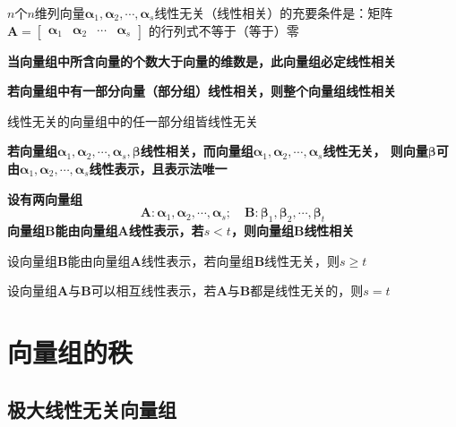 \documentclass[UTF8]{ctexart}
\newcommand{\ve}[1]{{\bm{#1}}}
\newcommand{\mat}[1]{\ve{#1}}
\newcommand{\emplin}{\vspace{1em}}
\begin{document}
$n$个$n$维列向量$\mat{\alpha}_1,\mat{\alpha}_2,\cdots,\mat{\alpha}_s$线性无关（线性相关）的充要条件是：矩阵$\mat{A}=\begin{bmatrix}\mat{\alpha}_1&\mat{\alpha}_2&\cdots&\mat{\alpha}_s\end{bmatrix}$
的行列式不等于（等于）零

\textbf{当向量组中所含向量的个数大于向量的维数是，此向量组必定线性相关}

\emplin
\emplin

\textbf{若向量组中有一部分向量（部分组）线性相关，则整个向量组线性相关}

线性无关的向量组中的任一部分组皆线性无关

\emplin
\emplin

\textbf{若向量组$\mat{\alpha}_1,\mat{\alpha}_2,\cdots,\mat{\alpha}_s,\mat{\beta}$线性相关，而向量组$\mat{\alpha}_1,\mat{\alpha}_2,\cdots,\mat{\alpha}_s$线性无关，
则向量$\mat{\beta}$可由$\mat{\alpha}_1,\mat{\alpha}_2,\cdots,\mat{\alpha}_s$线性表示，且表示法唯一}

\emplin
\emplin

\textbf{设有两向量组
\[\mat{A}:\mat{\alpha}_1,\mat{\alpha}_2,\cdots,\mat{\alpha}_s;\quad\mat{B}:\mat{\beta}_1,\mat{\beta}_2,\cdots,\mat{\beta}_t\]
向量组$\mat{B}$能由向量组$\mat{A}$线性表示，若$s<t$，则向量组$\mat{B}$线性相关}

设向量组$\mat{B}$能由向量组$\mat{A}$线性表示，若向量组$\mat{B}$线性无关，则$s\ge t$

设向量组$\mat{A}$与$\mat{B}$可以相互线性表示，若$\mat{A}$与$\mat{B}$都是线性无关的，则$s=t$

\section*{向量组的秩}
\subsection*{极大线性无关向量组}
\end{document}
